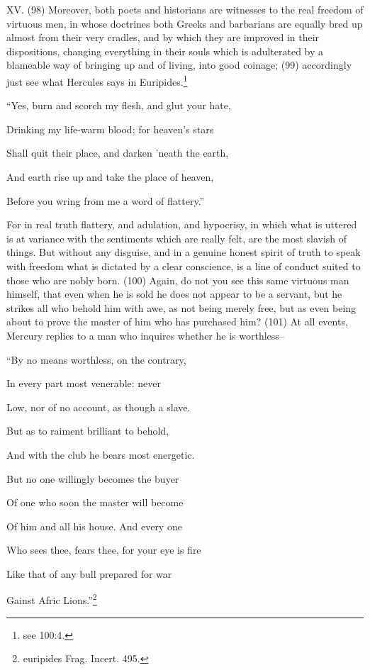 XV. (98) Moreover, both poets and historians are witnesses to the real freedom of virtuous men, in
whose doctrines both Greeks and barbarians are equally bred up almost from their very cradles,
and by which they are improved in their dispositions, changing everything in their souls which is
adulterated by a blameable way of bringing up and of living, into good coinage; (99) accordingly just
see what Hercules says in Euripides.\footnote{see 100:4.}

``Yes, burn and scorch my flesh, and glut your hate,

Drinking my life-warm blood; for heaven's stars

Shall quit their place, and darken 'neath the earth,

And earth rise up and take the place of heaven,

Before you wring from me a word of flattery.''

For in real truth flattery, and adulation, and hypocrisy, in which what is uttered is at variance with
the sentiments which are really felt, are the most slavish of things. But without any disguise, and in
a genuine honest spirit of truth to speak with freedom what is dictated by a clear conscience, is a
line of conduct suited to those who are nobly born. (100) Again, do not you see this same virtuous
man himself, that even when he is sold he does not appear to be a servant, but he strikes all who
behold him with awe, as not being merely free, but as even being about to prove the master of him
who has purchased him? (101) At all events, Mercury replies to a man who inquires whether he is
worthless--

``By no means worthless, on the contrary,

In every part most venerable: never

Low, nor of no account, as though a slave.

But as to raiment brilliant to behold,

And with the club he bears most energetic.

But no one willingly becomes the buyer

Of one who soon the master will become

Of him and all his house. And every one

Who sees thee, fears thee, for your eye is fire

Like that of any bull prepared for war

Gainst Afric Lions.''\footnote{euripides Frag. Incert. 495.}

